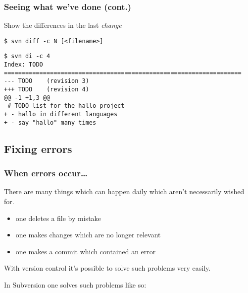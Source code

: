 \begin{frame}[fragile]
    \frametitle{Seeing what we've done (cont.)}
    \linuxframe
    \vspace*{-2mm}
    Show the differences in the last \emph{change}
\begin{lstlisting}
$ svn diff -c N [<filename>]
\end{lstlisting}

\begin{lstlisting}
$ svn di -c 4
Index: TODO
===================================================================
--- TODO    (revision 3)
+++ TODO    (revision 4)
@@ -1 +1,3 @@
 # TODO list for the hallo project
+ - hallo in different languages
+ - say "hallo" many times
\end{lstlisting}

\end{frame}

\subsection{Fixing errors}

\begin{frame}[fragile]
    \frametitle{When errors occur\ldots}
    There are many things which can happen daily which aren't necessarily
    wished for.
    \begin{itemize}
        \item one deletes a file by mistake
        \item one makes changes which are no longer relevant
        \item one makes a commit which contained an error
    \end{itemize}
    With version control it's possible to solve such problems very easily.

    In Subversion one solves such problems like so:
\end{frame}

